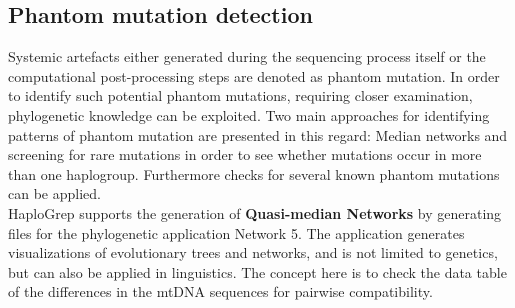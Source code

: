 \subsection{Phantom mutation detection}
Systemic artefacts either generated during the sequencing process itself or the computational post-processing steps are denoted as phantom mutation. In order to identify such potential phantom mutations, requiring closer examination, phylogenetic knowledge can be exploited. Two main approaches for identifying patterns of phantom mutation are presented in this regard: Median networks and screening for rare mutations in order to see whether mutations occur in more than one haplogroup. Furthermore checks for several known phantom mutations can be applied. \\
HaploGrep supports the generation of \textbf{Quasi-median Networks} by generating files for the phylogenetic application Network 5. The application generates visualizations of evolutionary trees and networks, and is not limited to genetics, but can also be applied in linguistics. The concept here is to check the data table of the differences in the mtDNA sequences for pairwise compatibility. \\

